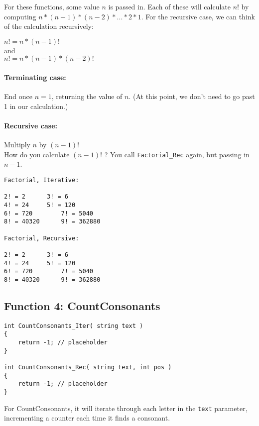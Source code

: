 For these functions, some value $n$ is passed in. Each of these will calculate
$n!$ by computing $n * (n-1) * (n-2) * ... * 2 * 1$.
For the recursive case, we can think of the calculation recursively:

\begin{center}
    $n! = n * (n-1)!$ \\ and \\ $n! = n * (n-1) * (n-2)!$
\end{center}

\paragraph{Terminating case:}
    End once $n = 1$, returning the value of $n$. (At this point,
    we don't need to go past 1 in our calculation.)

\paragraph{Recursive case:}
    Multiply $n$ by $(n-1)!$ \\
    How do you calculate $(n-1)!$ ? You call \texttt{Factorial\_Rec} again,
    but passing in $n-1$.

    
\begin{lstlisting}[style=output]
Factorial, Iterative:

2! = 2		3! = 6		
4! = 24		5! = 120		
6! = 720		7! = 5040		
8! = 40320		9! = 362880		

Factorial, Recursive:

2! = 2		3! = 6		
4! = 24		5! = 120		
6! = 720		7! = 5040		
8! = 40320		9! = 362880
\end{lstlisting}

\newpage

\subsection{Function 4: CountConsonants}

\begin{lstlisting}[style=code]
int CountConsonants_Iter( string text )
{
    return -1; // placeholder
}

int CountConsonants_Rec( string text, int pos )
{
    return -1; // placeholder
}
\end{lstlisting}

For CountConsonants, it will iterate through each letter in the
\texttt{text} parameter, incrementing a counter each time it finds a consonant.

